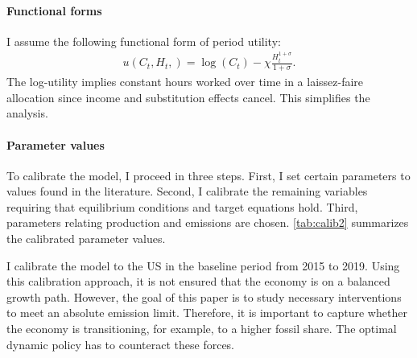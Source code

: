\paragraph{Functional forms}
I assume the following functional form of period utility:
\begin{align*}
u(C_t,H_{t}, )= \log(C_t)-\chi\frac{H_{t}^{1+\sigma}}{{1+\sigma}}.
\end{align*}
The log-utility implies constant hours worked over time in a laissez-faire allocation since income and substitution effects cancel. This simplifies the analysis. %


\paragraph{Parameter values}
To calibrate the model, I proceed in three steps. First, I set certain parameters to values found in the literature. Second, I calibrate the remaining variables requiring that equilibrium conditions and target equations hold. Third, parameters relating production and emissions are chosen. \autoref{tab:calib2} summarizes the calibrated parameter values.

I calibrate the model to the US in the baseline period from 2015 to 2019. Using this calibration approach, it is not ensured that the economy is on a balanced growth path. However, the goal of this paper is to study necessary interventions to meet an absolute emission limit. Therefore, %
it is important to capture whether the economy is transitioning, for example, to %
a higher fossil share. The optimal dynamic policy has to counteract these forces. %


